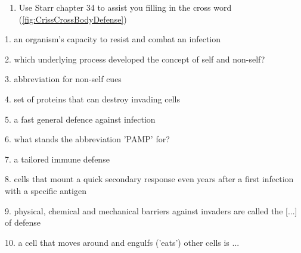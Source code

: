 
	\vspace{1cm}
	\begin{enumerate}[resume,itemsep=4pt, leftmargin=0cm]
	\item  Use  Starr chapter 34 to assist you filling in the cross word (\autoref{fig:CrissCrossBodyDefense})
	\end{enumerate}

	\enlargethispage{2cm}
	\hspace{-3.6cm}
	\begin{minipage}{16cm}
			\begin{multicols}{2}
			\bgroup \Ersatz{\tiny}{\small}
			1. an organism's capacity to resist and combat an infection

			2. which underlying process developed the concept of self and non-self?

			3. abbreviation for non-self cues

			4. set of proteins that can destroy invading cells

			5. a fast general defence against infection

			6. what stands the abbreviation 'PAMP' for?

			7. a tailored immune defense

			8. cells that mount a quick secondary response even years after a first infection with a specific antigen

			9. physical, chemical and mechanical barriers against invaders are called the [...] of defense

			10. a cell that moves around and engulfs ('eats') other cells is ...


\end{multicols}
\end{minipage}

